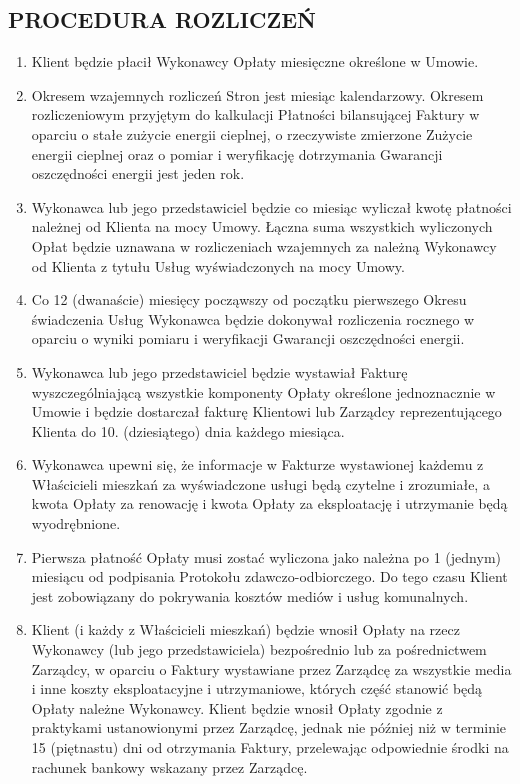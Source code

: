 \begin{multicols}{2}
\subsection{PROCEDURA ROZLICZEŃ}
\begin{enumerate}
	\item Klient będzie płacił Wykonawcy Opłaty miesięczne określone w Umowie.
	\item Okresem wzajemnych rozliczeń Stron jest miesiąc kalendarzowy. Okresem rozliczeniowym przyjętym do kalkulacji Płatności bilansującej Faktury w oparciu o stałe zużycie energii cieplnej, o rzeczywiste zmierzone Zużycie energii cieplnej oraz o pomiar i weryfikację dotrzymania Gwarancji oszczędności energii jest jeden rok.
	\item Wykonawca lub jego przedstawiciel będzie co miesiąc wyliczał kwotę płatności należnej od Klienta na mocy Umowy. Łączna suma wszystkich wyliczonych Opłat będzie uznawana w rozliczeniach wzajemnych za należną Wykonawcy od Klienta z tytułu Usług wyświadczonych na mocy Umowy.
	\item Co 12 (dwanaście) miesięcy począwszy od początku pierwszego Okresu świadczenia Usług Wykonawca będzie dokonywał rozliczenia rocznego w oparciu o wyniki pomiaru i weryfikacji Gwarancji oszczędności energii.
	\item Wykonawca lub jego przedstawiciel będzie wystawiał Fakturę wyszczególniającą wszystkie komponenty Opłaty określone jednoznacznie w Umowie i będzie dostarczał fakturę Klientowi lub Zarządcy reprezentującego Klienta do 10. (dziesiątego) dnia każdego miesiąca.
	\item Wykonawca upewni się, że informacje w Fakturze wystawionej każdemu z Właścicieli mieszkań za wyświadczone usługi będą czytelne i zrozumiałe, a kwota Opłaty za renowację i kwota Opłaty za eksploatację i utrzymanie będą wyodrębnione.
	\item Pierwsza płatność Opłaty musi zostać wyliczona jako należna po 1 (jednym) miesiącu od podpisania Protokołu zdawczo-odbiorczego. Do tego czasu Klient jest zobowiązany do pokrywania kosztów mediów i usług komunalnych.
	\item Klient (i każdy z Właścicieli mieszkań) będzie wnosił Opłaty na rzecz Wykonawcy (lub jego przedstawiciela) bezpośrednio lub za pośrednictwem Zarządcy, w oparciu o Faktury wystawiane przez Zarządcę za wszystkie media i inne koszty eksploatacyjne i utrzymaniowe, których część stanowić będą Opłaty należne Wykonawcy. Klient będzie wnosił Opłaty zgodnie z praktykami ustanowionymi przez Zarządcę, jednak nie później niż w terminie 15 (piętnastu) dni od otrzymania Faktury, przelewając odpowiednie środki na rachunek bankowy wskazany przez Zarządcę.

\end{enumerate}
\end{multicols}
